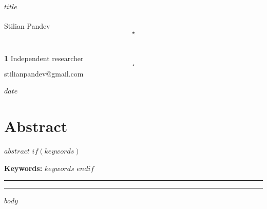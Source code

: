 \documentclass[submission, Phys]{SciPost}
\begin{document}
\begin{center}{\Large \textbf{$title$}}\end{center}

\begin{center}
Stilian Pandev\textsuperscript{$$\star$$}\,
\end{center}

\begin{center}
{\bf 1} Independent researcher
\\
\vspace{2pt}
$${}^\star$$ {\small \sf stilianpandev@gmail.com}
\end{center}

\begin{center}
$date$
\end{center}

\section*{Abstract}
{\bf
$abstract$
}
$if(keywords)$

\vspace{6pt}
\noindent\textbf{Keywords:} $keywords$
$endif$

\vspace{10pt}
\noindent\rule{\textwidth}{1pt}
\tableofcontents\thispagestyle{fancy}
\noindent\rule{\textwidth}{1pt}
\vspace{10pt}

$body$



\end{document}
